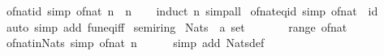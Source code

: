 \begin{isabellebody}
\ of{\isacharunderscore}{\kern0pt}nat{\isacharunderscore}{\kern0pt}id\ {\isacharbrackleft}{\kern0pt}simp{\isacharbrackright}{\kern0pt}{\isacharcolon}{\kern0pt}\ {\isachardoublequoteopen}of{\isacharunderscore}{\kern0pt}nat\ n\ {\isacharequal}{\kern0pt}\ n{\isachardoublequoteclose}\isanewline
%
\isadelimproof
\ \ %
\endisadelimproof
%
\isatagproof
{}\isamarkupfalse%
\ {\isacharparenleft}{\kern0pt}induct\ n{\isacharparenright}{\kern0pt}\ simp{\isacharunderscore}{\kern0pt}all%
\endisatagproof
{\isafoldproof}%
%
\isadelimproof
\isanewline
%
\endisadelimproof
\isanewline
{}\isamarkupfalse%
\ of{\isacharunderscore}{\kern0pt}nat{\isacharunderscore}{\kern0pt}eq{\isacharunderscore}{\kern0pt}id\ {\isacharbrackleft}{\kern0pt}simp{\isacharbrackright}{\kern0pt}{\isacharcolon}{\kern0pt}\ {\isachardoublequoteopen}of{\isacharunderscore}{\kern0pt}nat\ {\isacharequal}{\kern0pt}\ id{\isachardoublequoteclose}\isanewline
%
\isadelimproof
\ \ %
\endisadelimproof
%
\isatagproof
{}\isamarkupfalse%
\ {\isacharparenleft}{\kern0pt}auto\ simp\ add{\isacharcolon}{\kern0pt}\ fun{\isacharunderscore}{\kern0pt}eq{\isacharunderscore}{\kern0pt}iff{\isacharparenright}{\kern0pt}%
\endisatagproof
{\isafoldproof}%
%
\isadelimproof
%
\endisadelimproof
%
\isadelimdocument
%
\endisadelimdocument
%
\isatagdocument
%
\isamarkuptrue%
%
\endisatagdocument
{\isafolddocument}%
%
\isadelimdocument
%
\endisadelimdocument
{}\isamarkupfalse%
\ semiring{\isacharunderscore}{\kern0pt}{}\isanewline
{}\isanewline
\isanewline
{}\isamarkupfalse%
\ Nats\ {\isacharcolon}{\kern0pt}{\isacharcolon}{\kern0pt}\ {\isachardoublequoteopen}{\isacharprime}{\kern0pt}a\ set{\isachardoublequoteclose}\ \ {\isacharparenleft}{\kern0pt}{\isachardoublequoteopen}{\isasymnat}{\isachardoublequoteclose}{\isacharparenright}{\kern0pt}\isanewline
\ \ \ {\isachardoublequoteopen}{\isasymnat}\ {\isacharequal}{\kern0pt}\ range\ of{\isacharunderscore}{\kern0pt}nat{\isachardoublequoteclose}\isanewline
\isanewline
{}\isamarkupfalse%
\ of{\isacharunderscore}{\kern0pt}nat{\isacharunderscore}{\kern0pt}in{\isacharunderscore}{\kern0pt}Nats\ {\isacharbrackleft}{\kern0pt}simp{\isacharbrackright}{\kern0pt}{\isacharcolon}{\kern0pt}\ {\isachardoublequoteopen}of{\isacharunderscore}{\kern0pt}nat\ n\ {\isasymin}\ {\isasymnat}{\isachardoublequoteclose}\isanewline
%
\isadelimproof
\ \ %
\endisadelimproof
%
\isatagproof
{}\isamarkupfalse%
\ {\isacharparenleft}{\kern0pt}simp\ add{\isacharcolon}{\kern0pt}\ Nats{\isacharunderscore}{\kern0pt}def{\isacharparenright}{\kern0pt}%

\end{isabellebody}
